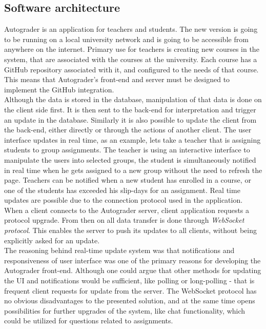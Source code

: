 \subsection{Software architecture}
Autograder is an application for teachers and students. The new version is going to be running on a local university network and is going to be accessible from anywhere on the internet. Primary use for teachers is creating new courses in the system, that are associated with the courses at the university. Each course has a GitHub repository associated with it, and configured to the needs of that course. This means that Autograder's front-end and server must be designed to implement the GitHub integration.
\\Although the data is stored in the database, manipulation of that data is done on the client side first. It is then sent to the back-end for interpretation and trigger an  update in the database. Similarly it is also possible to update the client from the back-end, either directly or through the actions of another client. The user interface updates in real time, as an example, lets take a teacher that is assigning students to group assignments. The teacher is using an interactive interface to manipulate the users into selected groups, the student is simultaneously notified in real time when he gets assigned to a new group without the need to refresh the page. Teachers can be notified when a new student has enrolled in a course, or one of the students has exceeded his slip-days for an assignment. Real time updates are possible due to the connection protocol used in the application. When a client connects to the Autograder server, client application requests a protocol upgrade. From then on all data transfer is done through \emph{WebSocket protocol}\cite{websocket}. This enables the server to push its updates to all clients, without being explicitly asked for an update.
\\The reasoning behind real-time update system was that notifications and responsiveness of user interface was one of the primary reasons for developing the Autograder front-end. Although one could argue that other methods for updating the UI and notifications would be sufficient, like polling or long-polling - that is frequent client requests for update from the server. The WebSocket protocol has no obvious disadvantages to the presented solution, and at the same time opens possibilities for further upgrades of the system, like chat functionality, which could be utilized for questions related to assignments.

